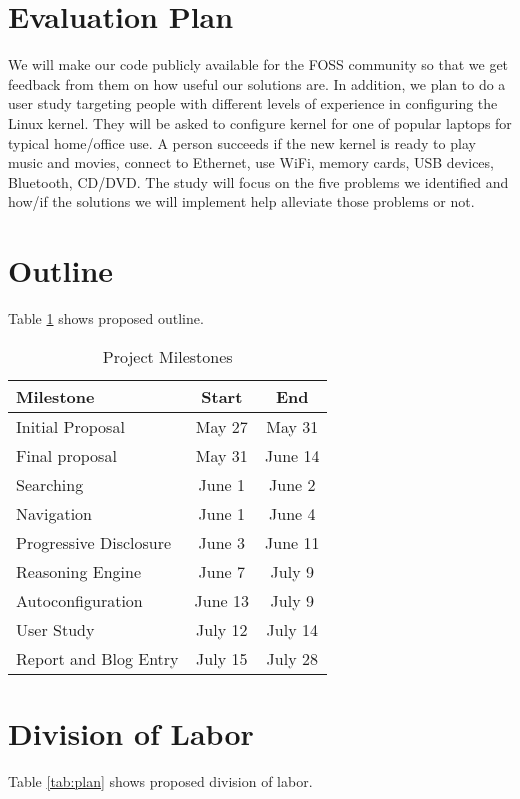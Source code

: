 \documentclass{chi2009}
\begin{document}
\section{Evaluation Plan}

We will make our code publicly available for the FOSS community so that we get feedback from them on how useful our solutions are. In addition, we plan to do a user study targeting people with different levels of experience in configuring the Linux kernel. They will be asked to configure kernel for one of popular laptops for typical home/office use. A person succeeds if the new kernel is ready to play music and movies, connect to Ethernet, use WiFi, memory cards, USB devices, Bluetooth, CD/DVD. The study will focus on the five problems we identified and how/if the solutions we will implement help alleviate those problems or not.

\section{Outline}
Table \ref{tab:outline} shows proposed outline.

\begin{table}[!h]
\centering
\begin{tabularx}{0.5\textwidth}{X c c}
\toprule
\textbf{Milestone} & \textbf{Start} & \textbf{End}\\ \midrule
Initial Proposal & May 27 & May 31\\
Final proposal & May 31 & June 14 \\
Searching & June 1 & June 2\\
Navigation & June 1 & June 4\\
Progressive Disclosure & June 3 & June 11\\
Reasoning Engine & June 7 & July 9\\
Autoconfiguration & June 13 & July 9\\
User Study & July 12 & July 14\\
Report and Blog Entry & July 15 & July 28\\
\bottomrule
\end{tabularx}
\caption{Project Milestones}
\label{tab:outline}
\end{table}

\section{Division of Labor}
Table \ref{tab:plan} shows proposed division of labor.
\end{document}
